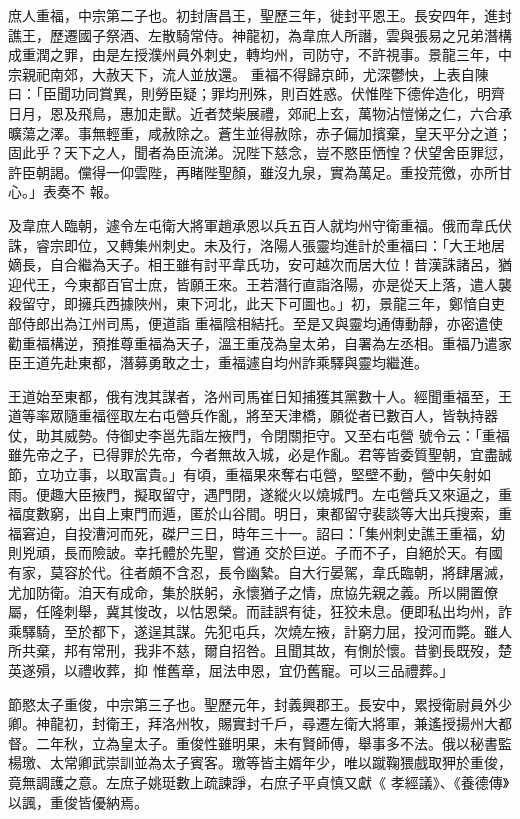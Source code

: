 \begin{pinyinscope}
 庶人重福，中宗第二子也。初封唐昌王，聖歷三年，徙封平恩王。長安四年，進封譙王，歷遷國子祭酒、左散騎常侍。神龍初，為韋庶人所譖，雲與張易之兄弟潛構成重潤之罪，由是左授濮州員外刺史，轉均州，司防守，不許視事。景龍三年，中宗親祀南郊，大赦天下，流人並放還。
 重福不得歸京師，尤深鬱怏，上表自陳曰：「臣聞功同賞異，則勞臣疑；罪均刑殊，則百姓惑。伏惟陛下德侔造化，明齊日月，恩及飛鳥，惠加走獸。近者焚柴展禮，郊祀上玄，萬物沾愷悌之仁，六合承曠蕩之澤。事無輕重，咸赦除之。蒼生並得赦除，赤子偏加擯棄，皇天平分之道；固此乎？天下之人，聞者為臣流涕。況陛下慈念，豈不愍臣恓惶？伏望舍臣罪愆，許臣朝謁。儻得一仰雲陛，再睹陛聖顏，雖沒九泉，實為萬足。重投荒徼，亦所甘心。」表奏不
 報。



 及韋庶人臨朝，遽令左屯衛大將軍趙承恩以兵五百人就均州守衛重福。俄而韋氏伏誅，睿宗即位，又轉集州刺史。未及行，洛陽人張靈均進計於重福曰：「大王地居嫡長，自合繼為天子。相王雖有討平韋氏功，安可越次而居大位！昔漢誅諸呂，猶迎代王，今東都百官士庶，皆願王來。王若潛行直詣洛陽，亦是從天上落，遣人襲殺留守，即擁兵西據陜州，東下河北，此天下可圖也。」初，景龍三年，鄭愔自吏部侍郎出為江州司馬，便道詣
 重福陰相結托。至是又與靈均通傳動靜，亦密遣使勸重福構逆，預推尊重福為天子，溫王重茂為皇太弟，自署為左丞相。重福乃遣家臣王道先赴東都，潛募勇敢之士，重福遽自均州詐乘驛與靈均繼進。



 王道始至東都，俄有洩其謀者，洛州司馬崔日知捕獲其黨數十人。經聞重福至，王道等率眾隨重福徑取左右屯營兵作亂，將至天津橋，願從者已數百人，皆執持器仗，助其威勢。侍御史李邕先詣左掖門，令閉關拒守。又至右屯營
 號令云：「重福雖先帝之子，已得罪於先帝，今者無故入城，必是作亂。君等皆委質聖朝，宜盡誠節，立功立事，以取富貴。」有頃，重福果來奪右屯營，堅壁不動，營中矢射如雨。便趣大臣掖門，擬取留守，遇門閉，遂縱火以燒城門。左屯營兵又來逼之，重福度數窮，出自上東門而遁，匿於山谷間。明日，東都留守裴談等大出兵搜索，重福窘迫，自投漕河而死，磔尸三日，時年三十一。詔曰：「集州刺史譙王重福，幼則兇頑，長而險詖。幸托體於先聖，嘗通
 交於巨逆。子而不子，自絕於天。有國有家，莫容於代。往者頗不含忍，長令幽縶。自大行晏駕，韋氏臨朝，將肆屠滅，尤加防衛。洎天有成命，集於朕躬，永懷猶子之情，庶協先親之義。所以開置僚屬，任隆刺舉，冀其悛改，以怙恩榮。而詿誤有徒，狂狡未息。便即私出均州，詐乘驛騎，至於都下，遂逞其謀。先犯屯兵，次燒左掖，計窮力屈，投河而斃。雖人所共棄，邦有常刑，我非不慈，爾自招咎。且聞其故，有惻於懷。昔劉長既歿，楚英遂殞，以禮收葬，抑
 惟舊章，屈法申恩，宜仍舊寵。可以三品禮葬。」



 節愍太子重俊，中宗第三子也。聖歷元年，封義興郡王。長安中，累授衛尉員外少卿。神龍初，封衛王，拜洛州牧，賜實封千戶，尋遷左衛大將軍，兼遙授揚州大都督。二年秋，立為皇太子。重俊性雖明果，未有賢師傅，舉事多不法。俄以秘書監楊璬、太常卿武崇訓並為太子賓客。璬等皆主婿年少，唯以蹴鞠猥戲取狎於重俊，竟無調護之意。左庶子姚珽數上疏諫諍，右庶子平貞慎又獻《
 孝經議》、《養德傳》以諷，重俊皆優納焉。




\end{pinyinscope}
